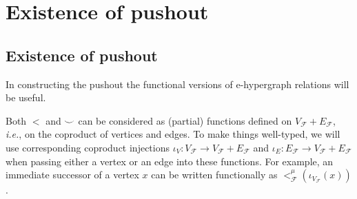 \ifdefined\ONECOLUMN
\section{Existence of pushout}
\else
\subsection{Existence of pushout}
\fi

In constructing the pushout the functional versions of e-hypergraph relations will be useful.
\begin{remark}
    Both $<$ and ${\smile}$ can be considered as (partial) functions defined on $V_{\mathcal{F}} + E_{\mathcal{F}}$, \textit{i.e.}, on the coproduct of vertices and edges.
    To make things well-typed, we will use corresponding coproduct injections $\iota_{V} : {V_{\mathcal{F}}} \to V_{\mathcal{F}} + E_{\mathcal{F}}$ and $\iota_{E} : {E_{\mathcal{F}}} \to V_{\mathcal{F}} + E_{\mathcal{F}}$ when passing either a vertex or an edge into these functions.
    For example, an immediate successor of a vertex $x$ can be written functionally as $<_{\mathcal{F}}^{\mu}(\iota_{V_{\mathcal{F}}}(x))$.
\end{remark}

